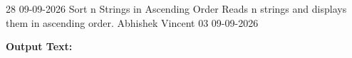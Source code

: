 \clearpage
\label{prog:28}
\programhead
  {28}
  {09-09-2026}
  {Sort n Strings in Ascending Order}
  {Reads n strings and displays them in ascending order.}
  {Abhishek Vincent}
  {03}
  {09-09-2026}

\divider
\textbf{Output Text:}\par
\vspace{2pt}

